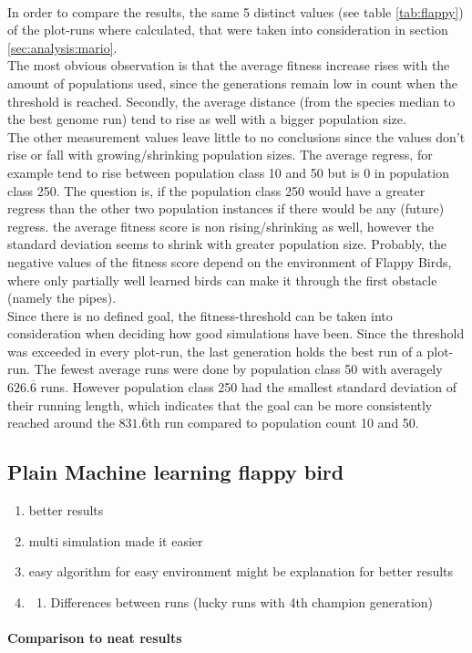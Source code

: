 			 \\
			In order to compare the results, the same 5 distinct values (see table \ref{tab:flappy}) of the plot-runs where calculated, that were taken into consideration in section \ref{sec:analysis:mario}.\\
			The most obvious observation is that the average fitness increase rises with the amount of populations used, since the generations remain low in count when the threshold is reached. Secondly, the average distance (from the species median to the best genome run) tend to rise as well with a bigger population size.\\ 
			The other measurement values leave little to no conclusions since the values don't rise or fall with growing/shrinking population sizes. The average regress, for example tend to rise between population class 10 and 50 but is 0 in population class 250. The question is, if the population class 250 would have a greater regress than the other two population instances if there would be any (future) regress. the average fitness score is non rising/shrinking as well, however the standard deviation seems to shrink with greater population size. Probably, the negative values of the fitness score depend on the environment of Flappy Birds, where only partially well learned birds can make it through the first obstacle (namely the pipes).\\
			Since there is no defined goal, the fitness-threshold can be taken into consideration when deciding how good simulations have been. Since the threshold was exceeded in every plot-run, the last generation holds the best run of a plot-run. The fewest average runs were done by population class 50 with averagely $626.\overline{6}$ runs. However population class 250 had the smallest standard deviation of their running length, which indicates that the goal can be more consistently reached around the $831.\overline{6}$th run compared to population count 10 and 50.
			
		\subsection{Plain Machine learning flappy bird}
			\begin{enumerate}
				\item better results
				\item multi simulation made it easier
				\item easy algorithm for easy environment might be explanation for better results
				\item \begin{enumerate}
					\item Differences between runs (lucky runs with 4th champion generation)
				\end{enumerate}
			\end{enumerate}
			\paragraph{Comparison to \gls{neat} results}